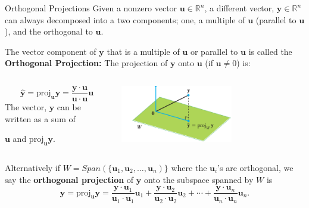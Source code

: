 \documentclass[10pt, aspectratio=169]{beamer}
\begin{document}
\begin{frame}{Orthogonal Projections}
Given a nonzero vector \(\mathbf{u}\in\mathbb{R}^n\), a different vector, \(\mathbf{y}\in\mathbb{R}^n\) can always decomposed into a two components; one, a multiple  of \(\mathbf{u}\) (parallel to \(\mathbf{u}\)), and the orthogonal to \(\mathbf{u}\).

The vector component of \(\mathbf{y}\) that is a multiple  of \(\mathbf{u}\) or parallel to \(\mathbf{u}\) is called the \textbf{Orthogonal Projection:} The projection of \( \mathbf{y} \) onto \(\mathbf{u}\) (if \( \mathbf{u} \neq 0 \)) is:

\begin{columns}
    \begin{column}{0.5\textwidth}
    \[
    \hat{\mathbf{y}} =\text{proj}_{\mathbf{u}} \mathbf{y} = \frac{\mathbf{y} \cdot \mathbf{u}}{\mathbf{u} \cdot \mathbf{u}} \mathbf{u}
    \]
    \hspace{0.7cm} The vector, \(\mathbf{y}\) can be written as a sum of 
    
    \hspace{0.7cm} \(\mathbf{u}\) and \(\text{proj}_{\mathbf{u}} \mathbf{y}\).
    \end{column}
    \begin{column}{0.6\textwidth}
    \includegraphics[width=0.6\textwidth]{figures/projection.png}
    \end{column}
\end{columns}


Alternatively if \(W=Span(\{\mathbf{u}_1,\mathbf{u}_2,\ldots,\mathbf{u}_n)\}\) where the \(\mathbf{u}_i\)'s are orthogonal, we say the \textbf{orthogonal projection} of \(\mathbf{y}\) onto the subspace spanned by \(W\) is
\[
\hat{\mathbf{y}} =\text{proj}_{\mathbf{u}} \mathbf{y} = \frac{\mathbf{y} \cdot \mathbf{u}_1}{\mathbf{u}_1 \cdot \mathbf{u}_1} \mathbf{u}_1 +
\frac{\mathbf{y} \cdot \mathbf{u}_2}{\mathbf{u}_2 \cdot \mathbf{u}_2} \mathbf{u}_2 + \cdots +
\frac{\mathbf{y} \cdot \mathbf{u}_n}{\mathbf{u}_n \cdot \mathbf{u}_n} \mathbf{u}_n.
\]

\end{frame}
\end{document}
